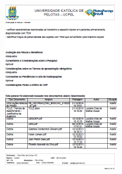 \documentclass[chapter=TITLE,
               oneside,
               12pt,
               a4paper,
               english,
               brazil]{abntex2}    %
\begin{document}
\begin{anexosenv}
        \begin{center}
        \includegraphics[width=.95\textwidth]{img/cartacep02.pdf}
        \end{center}


\end{anexosenv}
\end{document}
